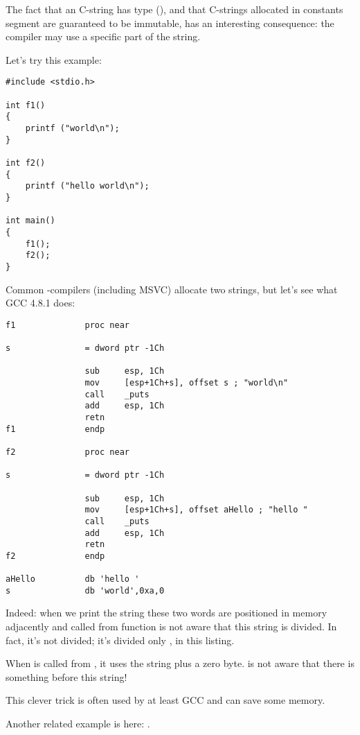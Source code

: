 \label{use_parts_of_C_strings}

The fact that an  C-string has  type (), 
and that C-strings allocated in constants segment are guaranteed to be immutable, has an interesting consequence:
the compiler may use a specific part of the string.

Let's try this example:

\begin{lstlisting}
#include <stdio.h>

int f1()
{
	printf ("world\n");
}

int f2()
{
	printf ("hello world\n");
}

int main()
{
	f1();
	f2();
}
\end{lstlisting}

Common \CCpp{}-compilers (including MSVC) allocate two strings, but let's see what GCC 4.8.1 does:

\begin{lstlisting}[caption=GCC 4.8.1 + IDA listing]
f1              proc near

s               = dword ptr -1Ch

                sub     esp, 1Ch
                mov     [esp+1Ch+s], offset s ; "world\n"
                call    _puts
                add     esp, 1Ch
                retn
f1              endp

f2              proc near

s               = dword ptr -1Ch

                sub     esp, 1Ch
                mov     [esp+1Ch+s], offset aHello ; "hello "
                call    _puts
                add     esp, 1Ch
                retn
f2              endp

aHello          db 'hello '
s               db 'world',0xa,0
\end{lstlisting}

Indeed: when we print the  string
these two words are positioned in memory adjacently and \puts called from 
function is not aware that this string is divided. 
In fact, it's not divided; it's divided only , in this listing.

When \puts is called from , it uses the  string plus a zero byte. \puts is not aware that there is something before this string!

This clever trick is often used by at least GCC and can save some memory.

Another related example is here: .

